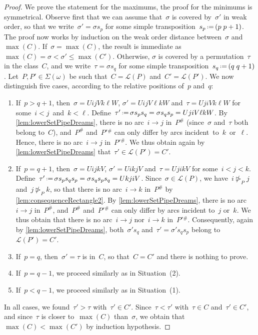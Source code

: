 \documentclass[reqno]{amsart}
\theoremstyle{definition}
\newcommand{\eqdef}{\mbox{\,\raisebox{0.2ex}{\scriptsize\ensuremath{\mathrm:}}\ensuremath{=}\,}} %
\newcommand{\contact}{^\#} %
\newcommand{\acyclicPipeDreams}{\Sigma} %
\newcommand{\linearExtensions}{\mathcal{L}} %
\newcommand{\more}{\vartriangleright} %
\newcommand{\contactMore}[1]{\more_{#1}} %
\begin{document}
\begin{proof}
We prove the statement for the maximums, the proof for the minimums is symmetrical.
Observe first that we can assume that~$\sigma$ is covered by~$\sigma'$ in weak order, so that we write~${\sigma' = \sigma s_p}$ for some simple transposition~$s_p \eqdef (p \; p+1)$.
The proof now works by induction on the weak order distance between~$\sigma$ and~$\max(C)$.
If~$\sigma = \max(C)$, the result is immediate as~${\max(C) = \sigma < \sigma' \le \max(C')}$.
Otherwise, $\sigma$ is covered by a permutation~$\tau$ in the class~$C$, and we write~$\tau = \sigma s_q$ for some simple transposition~$s_q \eqdef (q \; q+1)$.
Let~$P,P' \in \acyclicPipeDreams(\omega)$ be such that~$C = \linearExtensions(P)$ and~$C' = \linearExtensions(P')$.
We now distinguish five cases, according to the relative positions of~$p$ and~$q$:
\begin{enumerate}[(1)]
\item If~$p > q+1$, then~$\sigma = UijVk\ell W$, $\sigma' = UijV\ell kW$ and~$\tau = UjiVk\ell W$ for some~$i < j$~and~${k < \ell}$. Define~$\tau' \eqdef \sigma s_p s_q = \sigma s_q s_p = UjiV\ell kW$. By \cref{lem:lowerSetPipeDreams}, there is no arc~$i \to j$ in~$P\contact$ (since~$\sigma$ and~$\tau$ both belong to~$C$), and~$P\contact$ and~$P'{}\contact$ can only differ by arcs incident~to~$k$~or~$\ell$. Hence, there is no arc~$i \to j$ in~$P'{}\contact$. We thus obtain again by \cref{lem:lowerSetPipeDreams} that~$\tau' \in \linearExtensions(P') = C'$.
\item If~$p = q+1$, then~$\sigma = UijkV$, $\sigma' = UikjV$ and~$\tau = UjikV$ for some~$i < j < k$. Define~$\tau' \eqdef \sigma s_p s_q s_p = \sigma s_q s_p s_q = UkjiV$. Since~$\sigma \in \linearExtensions(P)$, we have~$i \not\contactMore{P} j$ and~$j \not\contactMore{P} k$, so that there is no arc~$i \to k$ in~$P\contact$ by \cref{lem:consequenceRectangle2}. By \cref{lem:lowerSetPipeDreams}, there is no arc~$i \to j$ in~$P\contact$, and~$P\contact$ and~$P'{}\contact$ can only differ by arcs incident to~$j$ or~$k$. We thus obtain that there is no arc~$i \to j$ nor~$i \to k$ in~$P'{}\contact$. Consequently, again by \cref{lem:lowerSetPipeDreams}, both~$\sigma' s_q$ and~$\tau' = \sigma' s_q s_p$ belong to~$\linearExtensions(P') = C'$.
\item If~$p = q$, then~$\sigma' = \tau$ is in~$C$, so that~$C = C'$ and there is nothing to prove.
\item If~$p = q-1$, we proceed similarly as in Situation~(2).
\item If~$p < q-1$, we proceed similarly as in Situation~(1).
\end{enumerate}
In all cases, we found~$\tau' > \tau$ with~$\tau' \in C'$.
Since~$\tau < \tau'$ with~$\tau \in C$ and~$\tau' \in C'$, and since~$\tau$ is closer to~$\max(C)$ than~$\sigma$, we obtain that ${\max(C) < \max(C')}$ by induction hypothesis.
\end{proof}
\end{document}
